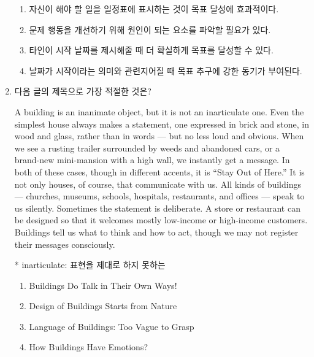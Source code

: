 \documentclass[a4paper, twocolumn]{oblivoir}
\begin{document}
\begin{enumerate}
        \begin{enumerate}
            \item 자신이 해야 할 일을 일정표에 표시하는 것이 목표 달성에 효과적이다.
            \item 문제 행동을 개선하기 위해 원인이 되는 요소를 파악할 필요가 있다. 
            \item 타인이 시작 날짜를 제시해줄 때 더 확실하게 목표를 달성할 수 있다.
            \item 날짜가 시작이라는 의미와 관련지어질 때 목표 추구에 강한 동기가 부여된다.

            \pagebreak
        
        \end{enumerate}
        \item 다음 글의 제목으로 가장 적절한 것은?
   
        A building is an inanimate object, but it is not an
        inarticulate one. Even the simplest house always makes a
        statement, one expressed in brick and stone, in wood and
        glass, rather than in words — but no less loud and obvious.
        When we see a rusting trailer surrounded by weeds and
        abandoned cars, or a brand-­new mini-­mansion with a high
        wall, we instantly get a message. In both of these cases,
        though in different accents, it is “Stay Out of Here.” It is
        not only houses, of course, that communicate with us. All
        kinds of buildings — churches, museums, schools, hospitals,
        restaurants, and offices — speak to us silently. Sometimes
        the statement is deliberate. A store or restaurant can be
        designed so that it welcomes mostly low-­income or
        high-­income customers. Buildings tell us what to think and
        how to act, though we may not register their messages
        consciously.
        \begin{flushright}
            \small{* inarticulate: 표현을 제대로 하지 못하는}
        \end{flushright}
        \begin{enumerate}
            \item Buildings Do Talk in Their Own Ways!
            \item Design of Buildings Starts from Nature
            \item Language of Buildings: Too Vague to Grasp
            \item How Buildings Have Emotions? 
        \end{enumerate}
        \pagebreak


\end{enumerate}
\end{document}
